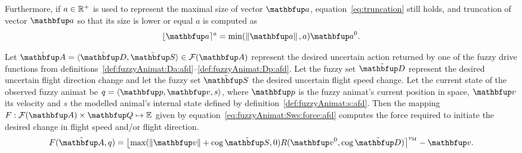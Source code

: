 Furthermore, if $a \in \mathbb{R}^+$ is used to represent the maximal size of vector $\vect{a}$, equa\-ti\-on~\eqref{eq:truncation} still holds, and truncation of vector $\vect{a}$ so that its size is lower or equal $a$ is computed as
%
\begin{equation}
\lfloor\vect{a}\rceil^{a} = \min(\left\|\vect{a}\right\|, a) \vect{a}^0. \nonumber
\end{equation}

Let $\fset{A}=\langle \fset{D}, \fset{S} \rangle \in \fpowset{\set{A}}$ represent the desired uncertain action returned by one of the fuzzy drive functions from definitions~\ref{def:fuzzyAnimat:Da:afd}--\ref{def:fuzzyAnimat:Dp:afd}. Let the fuzzy set $\fset{D}$ represent the desired uncertain flight direction change and let the fuzzy set $\fset{S}$ the desired uncertain flight speed change. Let the current state of the observed fuzzy animat be $q=\langle \vect{p}, \vect{v}, s \rangle$, where $\vect{p}$ is the fuzzy animat's current position in space, $\vect{v}$ its velocity and $s$ the modelled animal's internal state defined by definition~\ref{def:fuzzyAnimat:s:afd}. Then the mapping $F: \fpowset{\set{A}} \times \set{Q} \mapsto \E$ given by equation~\eqref{eq:fuzzyAnimat:Sws:force:afd} computes the force required to initiate the desired change in flight speed and/or flight direction.
\begin{equation}
F(\fset{A},q)=\left\lfloor\max(\left\|\vect{v}\right\|+\cog\fset{S},0)R(\vect{v}^0,\cog\fset{D})\right\rceil^{v_\textnormal{M}}-\vect{v}. \label{eq:fuzzyAnimat:Sws:force:afd}
\end{equation}

